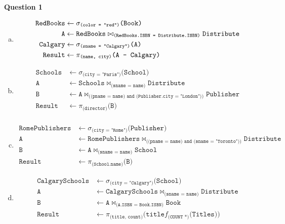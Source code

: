 \documentclass[11pt]{article}
\def\code#1{\texttt{#1}}
\def\select#1#2{\sigma_{\code{(#1)}} \code{(#2)}}
\def\join#1#2#3{\code{#1} \bowtie_{\code{(#2)}} \code{#3}}
\def\proj#1#2{\pi_{\code{(#1)}} \code{(#2)}}
\def\diff#1#2{\code{#1} - \code{#2}}
\def\fun#1#2{f_{\code{(#1)}}{\code{(#2)}}}
\def\fun#1#2#3{\code{#1}f_{\code{(#2)}}{\code{(#3)}}}
\begin{document}
\item[] \textbf{Question 1}

  \begin{enumerate}[a.]
    \item
      \begin{equation*}
      \begin{aligned}
        \code{RedBooks} &\leftarrow \select{color = "red"}{Book} \\
        \code{A} &\leftarrow \join{RedBooks}{RedBooks.ISBN = Distribute.ISBN}{Distribute} \\
        \code{Calgary} &\leftarrow \select{sname = "Calgary"}{A} \\
        \code{Result} &\leftarrow \proj{name, city} {\diff{A}{Calgary}}
      \end{aligned}
      \end{equation*}

    \item
      \begin{equation*}
      \begin{aligned}
        \code{Schools} &\leftarrow \select{city = "Paris"}{School} \\
        \code{A} &\leftarrow \join{Schools}{sname = name}{Distribute} \\
        \code{B} &\leftarrow \join{A}{(pname = name) and (Publisher.city = "London")}{Publisher} \\
        \code{Result} &\leftarrow \proj{director}{B} \\
      \end{aligned}
      \end{equation*}

    \item 
      \begin{equation*}
      \begin{aligned}
        \code{RomePublishers} &\leftarrow \select{city = "Rome"}{Publisher} \\
        \code{A} &\leftarrow \join{RomePublishers}{(pname = name) and (sname = "Toronto")}{Distribute} \\ %
        \code{B} &\leftarrow \join{A}{sname = name}{School} \\ %
        \code{Result} &\leftarrow \proj{School.name}{B}
      \end{aligned}
      \end{equation*}

    \item
      \begin{equation*}
      \begin{aligned}
        \code{CalgarySchools} &\leftarrow \select{city = "Calgary"}{School} \\
        \code{A} &\leftarrow \join{CalgarySchools}{sname = name}{Distribute} \\
        \code{B} &\leftarrow \join{A}{A.ISBN = Book.ISBN}{Book} \\
        \code{Result} &\leftarrow \pi_{\code{(title, count)}} \code{(}\fun{title}{COUNT *}{Titles}\code{)}
      \end{aligned}
      \end{equation*}


\end{enumerate}
\end{document}
